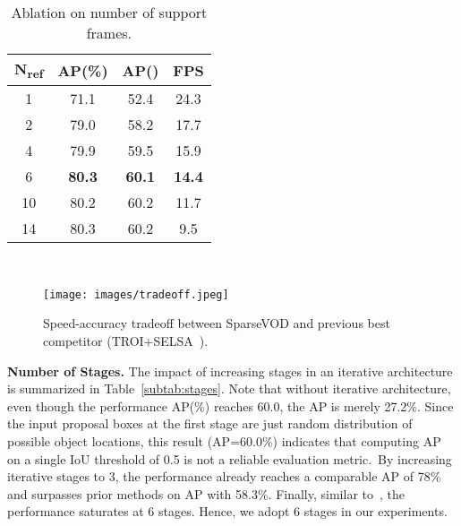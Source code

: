 \documentclass{bmvc2k}
\begin{document}
\begin{minipage}{\linewidth}

  \begin{minipage}{0.35\linewidth}
  \begin{table}[H]
  \hspace{-10pt}
    \small
        \begin{tabular}{c|ccc}
            \toprule
            N\textsubscript{ref} & AP(\%) &  AP()  & FPS \\
            \hline
            1 & 71.1 & 52.4 & 24.3\\
            2 & 79.0 & 58.2 & 17.7\\
            4 & 79.9 & 59.5 & 15.9\\
            {6} & \textbf{80.3} & \textbf{60.1} & \textbf{14.4}\\
            10 & 80.2 & 60.2 & 11.7\\
            14 & 80.3 & 60.2 & 9.5\\
            \bottomrule
        \end{tabular}\\ 
        \vspace{-5pt}
          \caption{Ablation on number of support frames.}
          \label{tab:ablation_support_frames}
      \end{table}
  \end{minipage}
  \hspace{0.03\linewidth}
  \begin{minipage}{0.55\linewidth}
        \begin{figure}[H]
        \texttt{[image: images/tradeoff.jpeg]}
        \vspace{-10pt}
        \caption{Speed-accuracy tradeoff between SparseVOD and previous best competitor (TROI+SELSA~\cite{gong2021temporal}).}
        \label{fig:tradeoff}
      \end{figure}
  \end{minipage}
\end{minipage}


\vspace{5pt}
\noindent \textbf{Number of Stages.}
The impact of increasing stages in an iterative architecture is summarized in Table~\ref{subtab:stages}. Note that without iterative architecture, even though the performance AP(\%) reaches 60.0, the AP is merely 27.2\%. Since the input proposal boxes at the first stage are just random distribution of possible object locations, this result (AP=60.0\%) indicates that computing AP on a single IoU threshold of 0.5 is not a reliable evaluation metric.~By increasing iterative stages to 3, the performance already reaches a comparable AP of 78\% and surpasses prior methods on AP with 58.3\%. Finally, similar to~\cite{sun2021sparse}, the performance saturates at 6 stages. Hence, we adopt 6 stages in our experiments.
\end{document}
